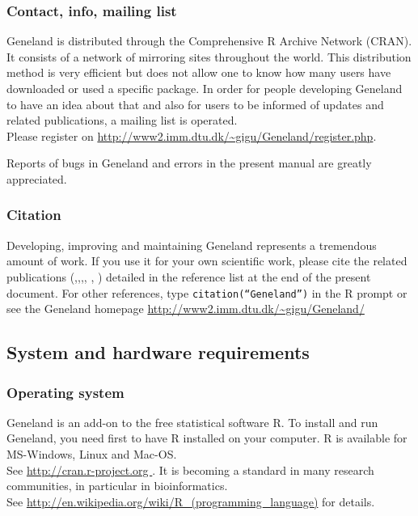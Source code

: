 \documentclass[a4paper,10pt]{article}
\begin{document}
\subsubsection{Contact, info, mailing list}

{\sc Geneland} is distributed through the Comprehensive R Archive Network (CRAN). 
It consists of a network of mirroring sites throughout the world. 
This distribution method is very efficient but does not allow one to know how many users have downloaded or 
used a specific package.  
In order for people developing {\sc Geneland}  to have an idea about that 
and also for users to be informed of updates and related publications, 
a mailing list is operated. \\
Please register on \url{http://www2.imm.dtu.dk/~gigu/Geneland/register.php}.


Reports of bugs in {\sc Geneland} and  errors  in the present manual are greatly appreciated.


\subsubsection{Citation}
Developing, improving and maintaining {\sc Geneland} represents a tremendous  amount of work.  
 If you use it for your own scientific work, 
please cite the related publications (\cite{Guillot05a},\cite{Guillot05c},\cite{Guillot08a},\cite{Guillot08b}, 
\cite{Guillot10b}, \cite{Guedj11}) 
detailed in the reference list at the end of the present document. 
For other references, type {\tt citation(``Geneland'')} in the R prompt or see the {\sc Geneland} homepage 
\url{http://www2.imm.dtu.dk/~gigu/Geneland/ }



\subsection{System and hardware requirements}
\subsubsection{Operating system}

{\sc Geneland} is an add-on to the free statistical software {\sc R}. 
To install and run {\sc Geneland}, 
you need first to have R installed on your computer. R is available for MS-Windows, Linux and Mac-OS. \\
See \url{http://cran.r-project.org }.
It is becoming a standard in many research communities, in particular in bioinformatics.\\
See \url{ http://en.wikipedia.org/wiki/R\_(programming\_language)} for details.\\
\end{document}
